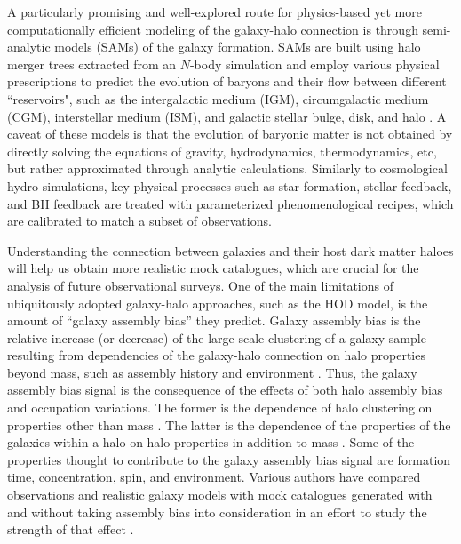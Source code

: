 \documentclass[fleqn,usenatbib]{mnras}
\begin{document}
A particularly promising and well-explored route for physics-based yet more computationally efficient modeling of the galaxy-halo connection is through semi-analytic models (SAMs) of the galaxy formation. SAMs are built using halo merger trees extracted from an $N$-body simulation and employ various physical prescriptions to predict the evolution of baryons and their flow between different ``reservoirs", such as the intergalactic medium (IGM), circumgalactic medium (CGM), interstellar medium (ISM), and galactic stellar bulge, disk, and halo \citep[for a review, see][]{2015ARA&A..53...51S}.  A caveat of these models is that the evolution of baryonic matter is not obtained by directly solving the equations of gravity, hydrodynamics, thermodynamics, etc, but rather approximated through analytic calculations. Similarly to cosmological hydro simulations, key physical processes such as star formation, stellar feedback, and BH feedback are treated with parameterized phenomenological recipes, which are calibrated to match a subset of observations.

Understanding the connection between galaxies and their host dark matter haloes will help us obtain more realistic mock catalogues, which are crucial for the analysis of future observational surveys. One of the main limitations of ubiquitously adopted galaxy-halo approaches, such as the HOD model, is the amount of ``galaxy assembly bias'' they predict. Galaxy assembly bias is the relative increase (or decrease) of the large-scale clustering of a galaxy sample resulting from dependencies of the galaxy-halo connection on halo properties beyond mass, such as assembly history and environment \citep[e.g.][]{2007MNRAS.374.1303C}. Thus, the galaxy assembly bias signal is the consequence of the effects of both halo assembly bias and occupation variations. The former is the dependence of halo clustering on properties other than mass \citep[e.g.][]{2005MNRAS.363L..66G}. The latter is the dependence of the properties of the galaxies within a halo on halo properties in addition to mass \citep[see][]{2018ApJ...853...84Z,2018MNRAS.480.3978A}. Some of the properties thought to contribute to the galaxy assembly bias signal are formation time, concentration, spin, and environment. Various authors have compared observations and realistic galaxy models with mock catalogues generated with and without taking assembly bias into consideration in an effort to study the strength of that effect \citep{2019MNRAS.484.1133C}.
\end{document}
